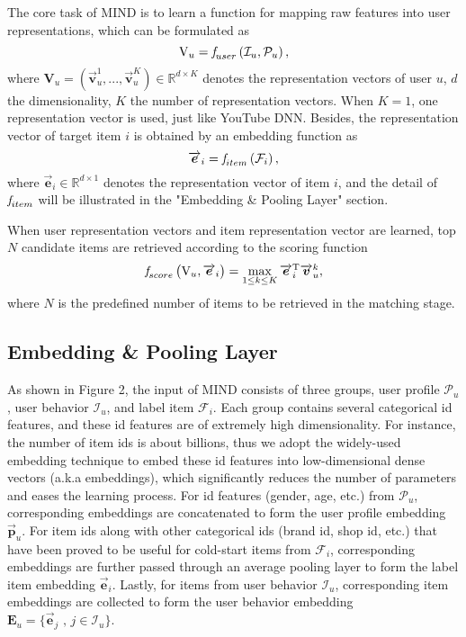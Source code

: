 \documentclass[sigconf]{acmart}
\begin{document}
The core task of MIND is to learn a function for mapping raw features into user representations, which can be formulated as
\begin{equation}
  \boldsymbol{\textrm{V}}_u = \emph{f}_{user} \left( \mathcal{I}_u, \mathcal{P}_u \right),
\end{equation}
where $\boldsymbol{\textrm{V}}_u = \left( \overrightarrow{\bm{v}}_u^{1}, ..., \overrightarrow{\bm{v}}_u^{K} \right) \in \mathbb{R}^{d \times K} $ denotes the representation vectors of user $u$, $d$ the dimensionality, $K$ the number of representation vectors.
When $K=1$, one representation vector is used, just like YouTube DNN.
Besides, the representation vector of target item $i$ is obtained by an embedding function as
\begin{equation}
  \overrightarrow{\boldsymbol{e}}_i = \emph{f}_{item} \left( \mathcal{F}_i \right),
\end{equation}
where $\overrightarrow{\boldsymbol{e}}_i \in \mathbb{R}^{d \times 1}$ denotes the representation vector of item $i$, and the detail of $\emph{f}_{item}$ will be illustrated in the "Embedding \& Pooling Layer" section.

When user representation vectors and item representation vector are learned, top $N$ candidate items are retrieved according to the scoring function
\begin{equation}
  \emph{f}_{score} \left(\boldsymbol{\textrm{V}}_u,  \overrightarrow{\boldsymbol{e}}_i \right) = \max \limits_{1\le k \le K}  \overrightarrow{\boldsymbol{e}}_i^{\textrm{T}} \overrightarrow{\bm{v}}_u^{k},
\end{equation}
where $N$ is the predefined number of items to be retrieved in the matching stage.

\subsection{Embedding \& Pooling Layer}
As shown in Figure 2, the input of MIND consists of three groups, user profile $\mathcal{P}_u$, user behavior $\mathcal{I}_u$, and label item $\mathcal{F}_i$.
Each group contains several categorical id features, and these id features are of extremely high dimensionality.
For instance, the number of item ids is about billions, thus we adopt the widely-used embedding technique to embed these id features into low-dimensional dense vectors (a.k.a embeddings), which significantly reduces the number of parameters and eases the learning process.
For id features (gender, age, etc.) from $\mathcal{P}_u$, corresponding embeddings are concatenated to form the user profile embedding $\overrightarrow{\boldsymbol{p}}_u$.
For item ids along with other categorical ids (brand id, shop id, etc.) that have been proved to be useful for cold-start items \cite{wang2018billion} from $\mathcal{F}_i$, corresponding embeddings are further passed through an average pooling layer to form the label item embedding $\overrightarrow{\boldsymbol{e}}_i$.
Lastly, for items from user behavior $\mathcal{I}_u$, corresponding item embeddings are collected to form the user behavior embedding $\boldsymbol{\textrm{E}}_u = \{ \overrightarrow{\boldsymbol{e}}_j \text{ , } j \in \mathcal{I}_u \}$.
\end{document}
